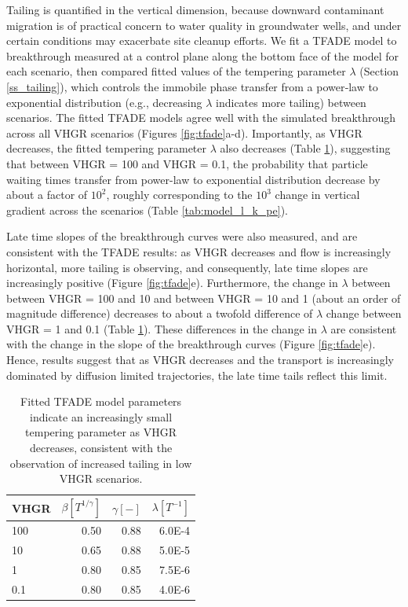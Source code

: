 Tailing is quantified in the vertical dimension, because downward contaminant migration is of practical concern to water quality in groundwater wells, and under certain conditions may exacerbate site cleanup efforts. We fit a TFADE model \citep{meerschaert2008tempered} to breakthrough measured at a control plane along the bottom face of the model for each scenario, then compared fitted values of the tempering parameter $\lambda$ (Section \ref{ss_tailing}), which controls the immobile phase transfer from a power‐law to exponential distribution (e.g., decreasing $\lambda$ indicates more tailing) between scenarios. 
The fitted TFADE models agree well with the simulated breakthrough across all VHGR scenarios (Figures \ref{fig:tfade}a-d). Importantly, as VHGR decreases, the fitted tempering parameter $\lambda$ also decreases (Table \ref{tab:tfade}), suggesting that between VHGR = 100 and VHGR = 0.1, the probability that particle waiting times transfer from power-law to exponential distribution decrease by about a factor of $10^2$, roughly corresponding to the $10^3$ change in vertical gradient across the scenarios (Table \ref{tab:model_l_k_pe}). 


Late time slopes of the breakthrough curves were also measured, and are consistent with the TFADE results: as VHGR decreases and flow is increasingly horizontal, more tailing is observing, and consequently, late time slopes are increasingly positive (Figure \ref{fig:tfade}e). Furthermore, the change in $\lambda$ between between VHGR = 100 and 10 and between VHGR = 10 and 1 (about an order of magnitude difference) decreases to about a twofold difference of $\lambda$ change between VHGR = 1 and 0.1 (Table \ref{tab:tfade}). These differences in the change in $\lambda$ are consistent with the change in the slope of the breakthrough curves (Figure \ref{fig:tfade}e). Hence, results suggest that as VHGR decreases and the transport is increasingly dominated by diffusion limited trajectories, the late time tails reflect this limit.



\bgroup
\begin{table}[ht]
\centering
\begin{tabular}{lrrr}
\hline
VHGR & $\beta [T^{1/ \gamma}]$ & $\gamma [-]$ & $\lambda [T^{-1}]$ \\

\hline
100 & 0.50 & 0.88 & 6.0E-4 \\
10  & 0.65 & 0.88 & 5.0E-5 \\
1   & 0.80 & 0.85 & 7.5E-6 \\
0.1 & 0.80 & 0.85 & 4.0E-6 \\

\hline
\end{tabular}
\caption{Fitted TFADE model parameters indicate an increasingly small tempering parameter as VHGR decreases, consistent with the observation of increased tailing in low VHGR scenarios.}
\label{tab:tfade}
\end{table}

